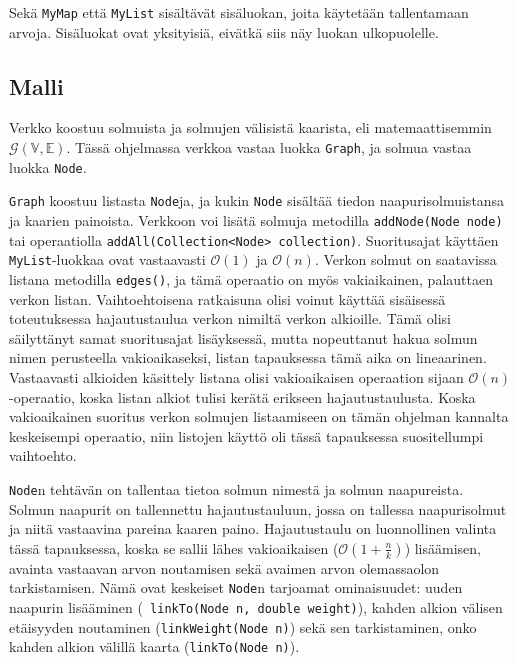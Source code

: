 \documentclass[10pt,a4paper]{article}
\begin{document}
Sekä \texttt{MyMap} että \texttt{MyList} sisältävät sisäluokan, joita käytetään tallentamaan arvoja. Sisäluokat ovat yksityisiä, eivätkä siis näy luokan ulkopuolelle.

\subsection{Malli}
\label{model.graph}

Verkko koostuu solmuista ja solmujen välisistä kaarista, eli matemaattisemmin $\mathcal{G}( \mathbb{V}, \mathbb{E})$. Tässä ohjelmassa verkkoa vastaa luokka \texttt{Graph}, ja solmua vastaa luokka \texttt{Node}.

\texttt{Graph} koostuu listasta \texttt{Node}ja, ja kukin \texttt{Node} sisältää tiedon naapurisolmuistansa ja kaarien painoista. Verkkoon voi lisätä solmuja metodilla \texttt{addNode(Node node)} tai operaatiolla \texttt{addAll(Collection<Node> collection)}. Suoritusajat käyttäen \texttt{MyList}-luokkaa ovat vastaavasti $\mathcal{O}(1)$ ja $\mathcal{O}(n)$. Verkon solmut on saatavissa listana metodilla \texttt{edges()}, ja tämä operaatio on myös vakiaikainen, palauttaen verkon listan. Vaihtoehtoisena ratkaisuna olisi voinut käyttää sisäisessä toteutuksessa hajautustaulua verkon nimiltä verkon alkioille. Tämä olisi säilyttänyt samat suoritusajat lisäyksessä, mutta nopeuttanut hakua solmun nimen perusteella vakioaikaseksi, listan tapauksessa tämä aika on lineaarinen. Vastaavasti alkioiden käsittely listana olisi vakioaikaisen operaation sijaan $\mathcal{O}(n)$-operaatio, koska listan alkiot tulisi kerätä erikseen hajautustaulusta. Koska vakioaikainen suoritus verkon solmujen listaamiseen on tämän ohjelman kannalta keskeisempi operaatio, niin listojen käyttö oli tässä tapauksessa suositellumpi vaihtoehto.

\texttt{Node}n tehtävän on tallentaa tietoa solmun nimestä ja solmun naapureista. Solmun naapurit on tallennettu hajautustauluun, jossa on tallessa naapurisolmut ja niitä vastaavina pareina kaaren paino. Hajautustaulu on luonnollinen valinta tässä tapauksessa, koska se sallii lähes vakioaikaisen ($\mathcal{O}(1 + \frac{n}{k})$) lisäämisen, avainta vastaavan arvon noutamisen sekä avaimen arvon olemassaolon tarkistamisen. Nämä ovat keskeiset \texttt{Node}n tarjoamat ominaisuudet: uuden naapurin lisääminen (\texttt{ linkTo(Node n, double weight)}), kahden alkion välisen etäisyyden noutaminen (\texttt{linkWeight(Node n)}) sekä sen tarkistaminen, onko kahden alkion välillä kaarta (\texttt{linkTo(Node n)}).
\end{document}
